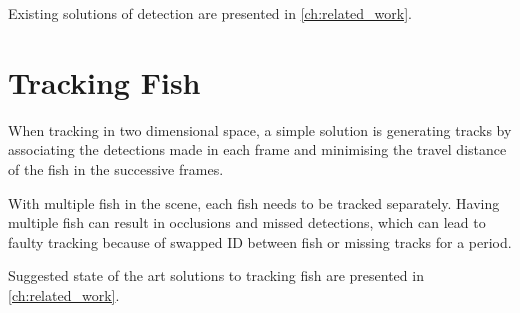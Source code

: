 Existing solutions of detection are presented in \autoref{ch:related_work}. 

\section{Tracking Fish}
When tracking in two dimensional space, a simple solution is generating tracks by associating the detections made in each frame and minimising the travel distance of the fish in the successive frames.

With multiple fish in the scene, each fish needs to be tracked separately. Having multiple fish can result in occlusions and missed detections, which can lead to faulty tracking because of swapped ID between fish or missing tracks for a period.

Suggested state of the art solutions to tracking fish are presented in \autoref{ch:related_work}.